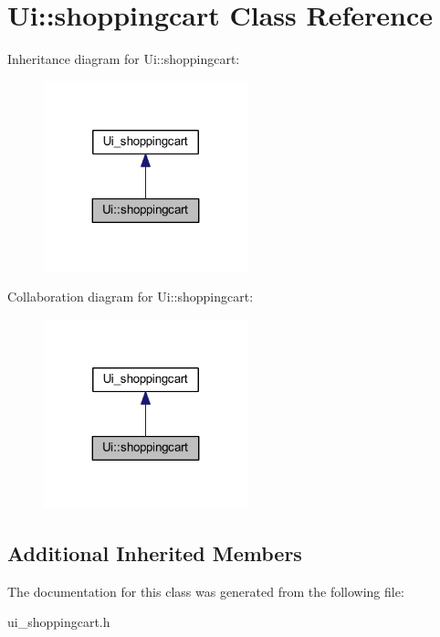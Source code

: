\hypertarget{class_ui_1_1shoppingcart}{}\section{Ui\+:\+:shoppingcart Class Reference}
\label{class_ui_1_1shoppingcart}


Inheritance diagram for Ui\+:\+:shoppingcart\+:
\nopagebreak
\begin{figure}[H]
\begin{center}
\leavevmode
\includegraphics[width=167pt]{class_ui_1_1shoppingcart__inherit__graph}
\end{center}
\end{figure}


Collaboration diagram for Ui\+:\+:shoppingcart\+:
\nopagebreak
\begin{figure}[H]
\begin{center}
\leavevmode
\includegraphics[width=167pt]{class_ui_1_1shoppingcart__coll__graph}
\end{center}
\end{figure}
\subsection*{Additional Inherited Members}


The documentation for this class was generated from the following file\+:\begin{DoxyCompactItemize}
\item 
ui\+\_\+shoppingcart.\+h\end{DoxyCompactItemize}
